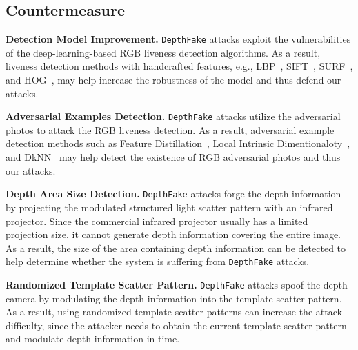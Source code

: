 


\subsection{Countermeasure}

\textbf{Detection Model Improvement. } \texttt{DepthFake} attacks exploit the vulnerabilities of the deep-learning-based RGB liveness detection algorithms.
As a result, liveness detection methods with handcrafted features, e.g., LBP~\cite{de2012lbp, boulkenafet2015face}, SIFT~\cite{patel2016secure}, SURF~\cite{boulkenafet2016face}, and HOG~\cite{komulainen2013context}, may help increase the robustness of the model and thus defend our attacks. 

\textbf{Adversarial Examples Detection.} \texttt{DepthFake} attacks utilize the adversarial photos to attack the RGB liveness detection. 
As a result, adversarial example detection methods such as Feature Distillation~\cite{liu2019feature}, Local Intrinsic Dimentionaloty~\cite{ma2018characterizing}, and DkNN~\cite{papernot2018deep}  may help detect the existence of  RGB adversarial photos and thus our attacks.

\textbf{Depth Area Size Detection. }  \texttt{DepthFake} attacks forge the depth information by projecting the modulated structured light scatter pattern with an infrared projector. Since the commercial infrared projector usually has a limited projection size, it cannot generate depth information covering the entire image. As a result,  the size of the area containing depth information can be detected to help determine whether the system is suffering from \texttt{DepthFake} attacks.

\textbf{Randomized Template Scatter Pattern.}  \texttt{DepthFake} attacks spoof the depth camera by modulating the depth information into the template scatter pattern. As a result, using randomized template scatter patterns can increase the attack difficulty, since the attacker needs to obtain the current template scatter pattern and modulate depth information in time. 

